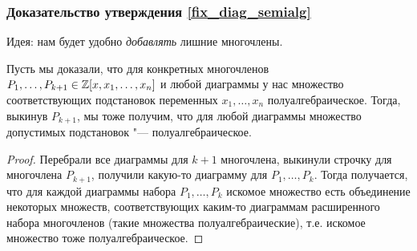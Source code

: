 \subsubsection{Доказательство утверждения \ref{fix_diag_semialg}}	
	Идея: нам будет удобно \textit{добавлять} лишние многочлены.
	\begin{assertion}
		Пусть мы доказали, что для конкретных многочленов $P_1, \dots, P_{k+1} \in \mathbb{Z}[x, x_1, \dots, x_n]$ и любой диаграммы
		у нас множество соответствующих подстановок переменных $x_1, \dots, x_n$ полуалгебраическое.
		Тогда, выкинув $P_{k+1}$, мы тоже получим, что для любой диаграммы множество допустимых подстановок "--- полуалгебраическое.
	\end{assertion}
	\begin{proof}
		Перебрали все диаграммы для $k+1$ многочлена, выкинули строчку для многочлена $P_{k+1}$, получили какую-то диаграмму для $P_1, \dots, P_k$.
		Тогда получается, что для каждой диаграммы набора $P_1, \dots, P_k$ искомое множество есть объединение некоторых множеств,
		соответствующих каким-то диаграммам расширенного набора многочленов (такие множества полуалгебраические), т.е.
		искомое множество тоже полуалгебраическое.
	\end{proof}

